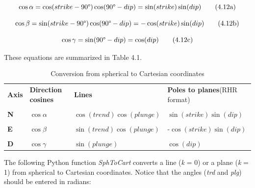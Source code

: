 \documentclass[a4paper , 12pt]{book}
\begin{document}
\begin{equation}
    \cos\alpha=\cos(strike-90\degree)\cos(90\degree-dip)=\sin(strike)\sin(dip) \tag{4.12a}
\end{equation}

\begin{equation}
     \cos\beta=\sin(strike-90\degree)\cos(90\degree-dip)=-\cos(strike)\sin(dip) \tag{4.12b}
\end{equation}

\begin{equation}
    \cos\gamma=\sin(90\degree-dip)=\cos(dip) \tag{4.12c}
\end{equation}

These equations are summarized in Table 4.1.

\begin{table}[h!]
\small
\centering
\begin{tabular}{p{1.5cm} p{2cm} p{4cm} p{3.5cm}} 
 \hline\hline
 \textbf{Axis} & \textbf{Direction cosines} & \textbf{Lines} & \textbf{Poles to planes}\newline (RHR format) \\ \\
 \hline
 \textbf{N} & $\cos\alpha$ & $\cos(trend)\cos(plunge)$ & $\sin(strike)\sin(dip)$ \\ \\
 \textbf{E} & $\cos\beta$ & $\sin(trend)\cos(plunge)$ & -$\cos(strike)\sin(dip)$ \\ \\
 \textbf{D} & $\cos\gamma$ & $\sin(plunge)$ & $\cos(dip)$ \\
 \hline\hline
\end{tabular}
\caption{Conversion from spherical to Cartesian coordinates}
\label{table4.1}
\end{table}

The following Python function \textit{SphToCart} converts a line (\textit{k} = 0) or a plane (\textit{k} = 1) from spherical to Cartesian coordinates. Notice that the angles (\textit{trd} and \textit{plg}) should be entered in radians:
\end{document}
